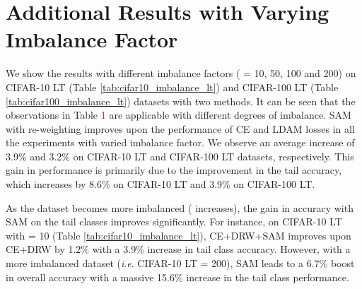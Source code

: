 \documentclass{article}
\newcommand{\ie}{\textit{i}.\textit{e}. }
\begin{document}
\section{Additional Results with Varying Imbalance Factor}
\label{app:different_if}
We show the results with different imbalance factors ( = 10, 50, 100 and 200) on CIFAR-10 LT (Table \ref{tab:cifar10_imbalance_lt}) and CIFAR-100 LT (Table \ref{tab:cifar100_imbalance_lt}) datasets with two methods. It can be seen that the observations in Table \textcolor{red}{1} are applicable with different degrees of imbalance. SAM with re-weighting improves upon the performance of CE and LDAM losses in all the experiments with varied imbalance factor. We observe an average increase of 3.9\% and 3.2\% on CIFAR-10 LT and CIFAR-100 LT datasets, respectively. This gain in performance is primarily due to the improvement in the tail accuracy, which increases by 8.6\% on CIFAR-10 LT and 3.9\% on CIFAR-100 LT.

As the dataset becomes more imbalanced ( increases), the gain in accuracy with SAM on the tail classes improves significantly. For instance, on CIFAR-10 LT with  = 10 (Table \ref{tab:cifar10_imbalance_lt}), CE+DRW+SAM improves upon CE+DRW by 1.2\% with a 3.9\% increase in tail class accuracy. However, with a more imbalanced dataset (\ie CIFAR-10 LT  = 200), SAM leads to a 6.7\% boost in overall accuracy with a massive 15.6\% increase in the tail class performance. 
\end{document}
